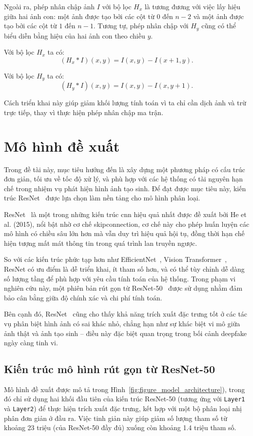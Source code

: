 Ngoài ra, phép nhân chập ảnh $I$ với bộ lọc $H_x$ là tương đương với việc 
lấy hiệu giữa hai ảnh con: một ảnh được tạo bởi các cột từ $0$ đến $n-2$ 
và một ảnh được tạo bởi các cột từ $1$ đến $n-1$. Tương tự, phép nhân chập với $H_y$ 
cũng có thể biểu diễn bằng hiệu của hai ảnh con theo chiều $y$. 

Với bộ lọc $H_x$ ta có:
\[
(H_x * I)(x,y) = I(x,y) - I(x+1,y).
\]

Với bộ lọc $H_y$ ta có:
\[
(H_y * I)(x,y) = I(x,y) - I(x,y+1).
\]

Cách triển khai này giúp giảm khối lượng tính toán vì ta chỉ cần dịch ảnh và trừ trực tiếp, 
thay vì thực hiện phép nhân chập ma trận.

\section{Mô hình đề xuất}

Trong đề tài này, mục tiêu hướng đến là xây dựng một phương pháp có cấu trúc đơn giản, tối ưu về tốc độ xử lý, và phù hợp với các hệ thống có tài nguyên hạn chế trong nhiệm vụ phát hiện hình ảnh tạo sinh. Để đạt được mục tiêu này, kiến trúc ResNet~\cite{He2015DeepRL} được lựa chọn làm nền tảng cho mô hình phân loại.

ResNet~\cite{He2015DeepRL} là một trong những kiến trúc \gls{cnn} hiệu quả nhất được đề xuất bởi He et al. (2015), nổi bật nhờ cơ chế \gls{skipconnection}, cơ chế này cho phép huấn luyện các mô hình có chiều sâu lớn hơn mà vẫn duy trì hiệu quả hội tụ, đồng thời hạn chế hiện tượng mất mát thông tin trong quá trình lan truyền ngược.

So với các kiến trúc phức tạp hơn như EfficientNet~\cite{zhong2024patchcraftexploringtexturepatch}, Vision Transformer~\cite{dosovitskiy2020image}, ResNet có ưu điểm là dễ triển khai, ít tham số hơn, và có thể tùy chỉnh dễ dàng số lượng tầng để phù hợp với yêu cầu tính toán của hệ thống. Trong phạm vi nghiên cứu này, một phiên bản rút gọn từ ResNet-50~\cite{He2015DeepRL} được sử dụng nhằm đảm bảo cân bằng giữa độ chính xác và chi phí tính toán.

Bên cạnh đó, ResNet~\cite{He2015DeepRL} cũng cho thấy khả năng trích xuất đặc trưng tốt ở các tác vụ phân biệt hình ảnh có sai khác nhỏ, chẳng hạn như sự khác biệt vi mô giữa ảnh thật và ảnh tạo sinh – điều này đặc biệt quan trọng trong bối cảnh \gls{deepfake} ngày càng tinh vi.

\subsection{Kiến trúc mô hình rút gọn từ ResNet-50}
\label{sec:kien_truc_mo_hinh_rut_gon_tu_resnet_50}
Mô hình đề xuất được mô tả trong Hình~\ref{fig:figure_model_architecture}), trong đó chỉ sử dụng hai khối đầu tiên của kiến trúc ResNet-50 (tương ứng với \texttt{Layer1} và \texttt{Layer2}) để thực hiện trích xuất đặc trưng, kết hợp với một bộ phân loại nhị phân đơn giản ở đầu ra. Việc tinh giản này giúp giảm số lượng tham số từ khoảng 23 triệu (của ResNet-50 đầy đủ) xuống còn khoảng 1.4 triệu tham số. 

